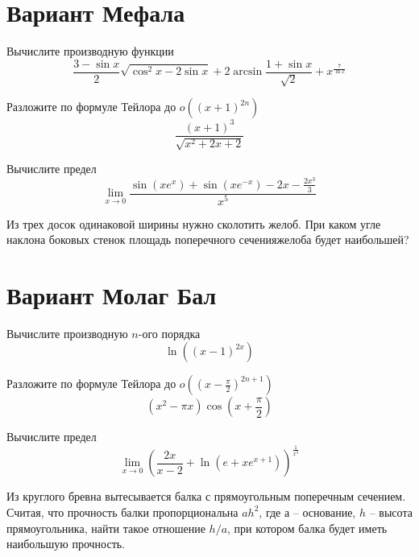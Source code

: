 \documentclass[russian]{article}
\begin{document}
\section*{Вариант Мефала}

Вычислите производную функции
$$\frac{3 - \sin x}{2}\sqrt{\cos^2 x - 2 \sin x} + 2\arcsin \frac{1 + \sin x}{\sqrt{2}} + x^\frac{7}{\ln x}$$

Разложите по формуле Тейлора до $o((x + 1)^{2n})$
$$\frac{(x + 1)^3}{\sqrt{x^2 + 2x + 2}}$$

Вычислите предел
$$\lim_{x \to 0}\frac{\sin(xe^x) + \sin (xe^{-x}) - 2x - \frac{2x^3}{3}}{x^5}$$

Из трех досок одинаковой ширины нужно сколотить желоб. При каком угле наклона боковых стенок площадь поперечного сеченияжелоба будет наибольшей?

\vspace{1cm}
\begin{center}
\end{center}
\newpage

\section*{Вариант Молаг Бал}

Вычислите производную $n$-ого порядка
$$\ln \left((x - 1)^{2x}\right)$$

Разложите по формуле Тейлора до $o((x - \frac{\pi}{2})^{2n + 1})$
$$(x^2 - \pi x) \cos\left(x + \frac{\pi}{2}\right)$$

Вычислите предел
$$\lim_{x \to 0} \left(\frac{2x}{x - 2} + \ln(e + xe^{x + 1})\right)^{\frac{1}{x^3}}$$

Из круглого бревна вытесывается балка с прямоугольным поперечным сечением. Считая, что прочность балки пропорциональна $ah^2$, где $а$ -- основание, $h$ -- высота прямоугольника, найти такое отношение $h/a$, при котором балка будет иметь наибольшую прочность.
\end{document}
